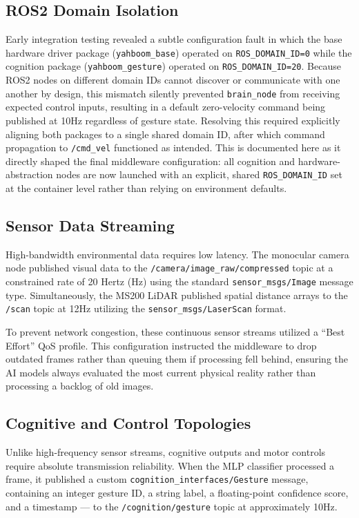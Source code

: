 \subsection{ROS2 Domain Isolation}
Early integration testing revealed a subtle configuration fault in which the base hardware driver package (\texttt{yahboom\_base}) operated on \texttt{ROS\_DOMAIN\_ID=0} while the cognition package (\texttt{yahboom\_gesture}) operated on \texttt{ROS\_DOMAIN\_ID=20}. Because ROS2 nodes on different domain IDs cannot discover or communicate with one another by design, this mismatch silently prevented \texttt{brain\_node} from receiving expected control inputs, resulting in a default zero-velocity command being published at 10Hz regardless of gesture state. Resolving this required explicitly aligning both packages to a single shared domain ID, after which command propagation to \texttt{/cmd\_vel} functioned as intended. This is documented here as it directly shaped the final middleware configuration: all cognition and hardware-abstraction nodes are now launched with an explicit, shared \texttt{ROS\_DOMAIN\_ID} set at the container level rather than relying on environment defaults.

\subsection{Sensor Data Streaming}
High-bandwidth environmental data requires low latency. The monocular camera node published visual data to the \texttt{/camera/image\_raw/compressed} topic at a constrained rate of 20 Hertz (Hz) using the standard \texttt{sensor\_msgs/Image} message type. Simultaneously, the MS200 LiDAR published spatial distance arrays to the \texttt{/scan} topic at 12Hz utilizing the \texttt{sensor\_msgs/LaserScan} format.

To prevent network congestion, these continuous sensor streams utilized a ``Best Effort'' QoS profile. This configuration instructed the middleware to drop outdated frames rather than queuing them if processing fell behind, ensuring the AI models always evaluated the most current physical reality rather than processing a backlog of old images.

\subsection{Cognitive and Control Topologies}
Unlike high-frequency sensor streams, cognitive outputs and motor controls require absolute transmission reliability. When the MLP classifier processed a frame, it published a custom \texttt{cognition\_interfaces/Gesture} message, containing an integer gesture ID, a string label, a floating-point confidence score, and a timestamp — to the \texttt{/cognition/gesture} topic at approximately 10Hz. 

